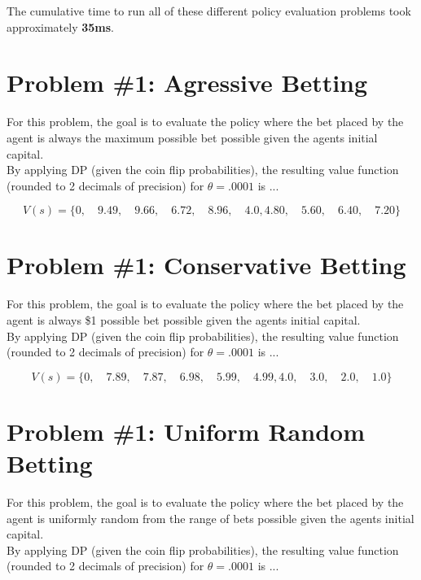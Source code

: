 \documentclass[12pt]{article}
\begin{document}
The cumulative time to run all of these different policy evaluation problems took approximately \textbf{35ms}.



\section*{Problem \#1: Agressive Betting}

For this problem, the goal is to evaluate the policy where the bet placed by the agent is always the maximum possible bet possible given the agents initial capital. \\

\noindent By applying DP (given the coin flip probabilities), the resulting value function (rounded to 2 decimals of precision) for $\theta = .0001$ is ...

$$
V(s) = \big\{ 0, \quad 9.49, \quad 9.66, \quad 6.72, \quad 8.96, \quad 4.0,  4.80, \quad 5.60, \quad 6.40, \quad 7.20 \big\}
$$




\section*{Problem \#1: Conservative Betting}


For this problem, the goal is to evaluate the policy where the bet placed by the agent is always \$1 possible bet possible given the agents initial capital. \\

\noindent By applying DP (given the coin flip probabilities), the resulting value function (rounded to 2 decimals of precision) for $\theta = .0001$ is ...

$$
V(s) = \big\{ 0, \quad 7.89, \quad 7.87, \quad 6.98, \quad 5.99, \quad 4.99,  4.0, \quad 3.0, \quad 2.0, \quad 1.0 \big\}
$$

\section*{Problem \#1: Uniform Random Betting}


For this problem, the goal is to evaluate the policy where the bet placed by the agent is uniformly random from the range of bets possible given the agents initial capital. \\

\noindent By applying DP (given the coin flip probabilities), the resulting value function (rounded to 2 decimals of precision) for $\theta = .0001$ is ...
\end{document}
